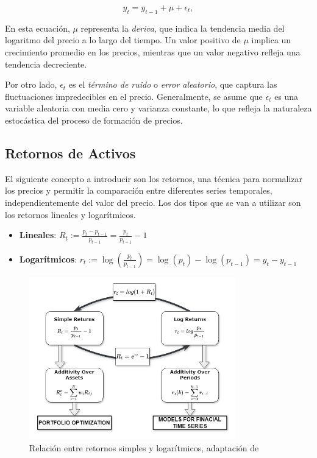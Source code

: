 \documentclass[a4paper,12pt, twoside]{report}
\begin{document}
\begin{equation}
y_t = y_{t-1} + \mu + \epsilon_t,
\end{equation}

En esta ecuación, $\mu$ representa la \textit{deriva}, que indica la tendencia media 
del logaritmo del precio a lo largo del tiempo. Un valor positivo de $\mu$ implica un 
crecimiento promedio en los precios, mientras que un valor negativo refleja una tendencia decreciente. 

Por otro lado, $\epsilon_t$ es el \textit{término de ruido} o \textit{error aleatorio}, que captura 
las fluctuaciones impredecibles en el precio. Generalmente, se asume que $\epsilon_t$ es 
una variable aleatoria con media cero y varianza constante, lo que refleja la naturaleza 
estocástica del proceso de formación de precios.



\subsection{Retornos de Activos}

El siguiente concepto a introducir son los retornos, una técnica para normalizar los precios y permitir la comparación 
entre diferentes series temporales, independientemente del valor del precio. Los dos tipos que se van a utilizar son 
los retornos lineales y logarítmicos.

\begin{itemize}
    \item \textbf{Lineales}: $R_t := \frac{p_t - p_{t-1}}{p_{t-1}} = \frac{p_t}{p_{t-1}} - 1$
    \item \textbf{Logarítmicos}: $r_t := \log\left(\frac{p_t}{p_{t-1}}\right) = \log(p_t) - \log(p_{t-1}) = y_t - y_{t-1}$
\end{itemize}

\begin{figure}[H]
    \centering
    \includegraphics[width=0.8\textwidth]{figures/simple_and_log_ret_relation.png}
    \caption{Relación entre retornos simples y logarítmicos, adaptación de \cite{signal_processing}}
    \label{fig:log-returns}
\end{figure}
\end{document}

